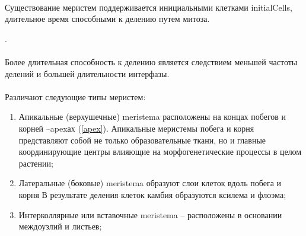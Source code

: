 
\paragraph*{}Существование меристем поддерживается инициальными клетками \gls{initialCells}, длительное время способными к делению путем митоза. 

.

\paragraph*{}Более длительная способность к делению является следствием меньшей частоты делений и большей длительности интерфазы.

\paragraph*{}Различают следующие типы меристем:

\begin{enumerate}
	\item Апикальные (верхушечные) \gls{meristema} расположены на концах побегов и корней --\gls{apex}ах (\ris \ref{apex}). Апикальные меристемы побега и корня представляют собой не только образовательные ткани, но и главные координирующие центры влияющие на морфогенетические процессы в целом растении;
	\item Латеральные (боковые) \gls{meristema} образуют слои клеток вдоль побега и корня В результате деления клеток камбия образуются ксилема и флоэма;
	\item Интерколлярные или вставочные \gls{meristema} -- расположены в основании междоузлий и листьев;
\end{enumerate}


